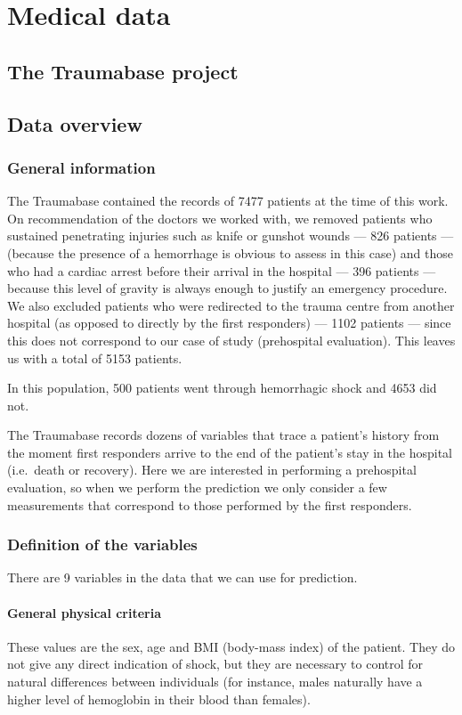 	\section{Medical data}
	\label{traumabase}
		\subsection{The Traumabase project}
	
		\subsection{Data overview}
		
			\subsubsection{General information}
The Traumabase contained the records of 7477 patients at the time of this work. On recommendation of the doctors we worked with, we removed patients who sustained penetrating injuries such as knife or gunshot wounds --- 826 patients --- (because the presence of a hemorrhage is obvious to assess in this case) and those who had a cardiac arrest before their arrival in the hospital --- 396 patients --- because this level of gravity is always enough to justify an emergency procedure. We also excluded patients who were redirected to the trauma centre from another hospital (as opposed to directly by the first responders) --- 1102 patients --- since this does not correspond to our case of study (prehospital evaluation). This leaves us with a total of 5153 patients.

In this population, 500 patients went through hemorrhagic shock and 4653 did not.
			
The Traumabase records dozens of variables that trace a patient's history from the moment first responders arrive to the end of the patient's stay in the hospital (i.e.\ death or recovery). Here we are interested in performing a prehospital evaluation, so when we perform the prediction we only consider a few measurements that correspond to those performed by the first responders. 

			\subsubsection{Definition of the variables}
There are 9 variables in the data that we can use for prediction.
\paragraph{General physical criteria}
These values are the sex, age and BMI (body-mass index) of the patient. They do not give any direct indication of shock, but they are necessary to control for natural differences between individuals (for instance, males naturally have a higher level of hemoglobin in their blood than females).

